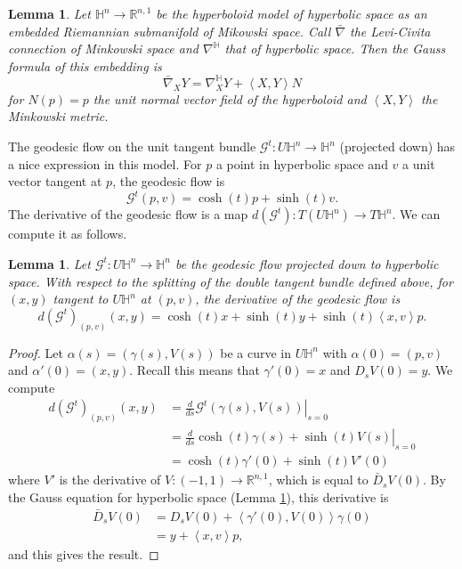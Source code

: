 \documentclass{amsart}
\newcommand{\R}{\mathbb{R}}
\newtheorem{lem}[thm]{Lemma}
\numberwithin{equation}{section}
\renewcommand{\H}{\mathbb{H}}
\begin{document}
\begin{lem}
\label{HypAsSub}
Let $\H^n \to \R^{n,1}$ be the hyperboloid model of hyperbolic space as an embedded Riemannian submanifold of Mikowski space. Call $\bar{\nabla}$ the Levi-Civita connection of Minkowski space and $\nabla^{\H}$ that of hyperbolic space. Then the Gauss formula of this embedding is 
\[
\bar{\nabla}_XY = \nabla^{\H}_XY + \left<X,Y\right>N
\]
for $N(p) = p$ the unit normal vector field of the hyperboloid and $\left<X,Y \right>$ the Minkowski metric.
\end{lem}

The geodesic flow on the unit tangent bundle $\mathcal{G}^t :U \H^n \to \H^n$ (projected down) has a nice expression in this model. 
For $p$ a point in hyperbolic space and $v$ a unit vector tangent at $p$, the geodesic flow is
\[
\mathcal{G}^t(p,v) = \cosh(t)p + \sinh(t)v.
\]
The derivative of the geodesic flow is a map $d(\mathcal{G}^t) : T(U\H^n) \to T\H^n$.
We can compute it as follows.

\begin{lem}
\label{DerGeo}
Let $\mathcal{G}^t: U\H^n \to \H^n$ be the geodesic flow projected down to hyperbolic space. With respect to the splitting of the double tangent bundle defined above, for $(x,y)$ tangent to $U\H^n$ at $(p,v)$, the derivative of the geodesic flow is 
\[
d(\mathcal{G}^t)_{(p,v)}(x,y) = \cosh(t)x + \sinh(t)y + \sinh(t)\left<x,v\right>p.
\]
\end{lem}

\begin{proof}
Let $\alpha(s) = (\gamma(s),V(s))$ be a curve in $U\H^n$ with $\alpha(0) = (p,v)$ and $\alpha'(0) = (x,y)$. 
Recall this means that $\gamma'(0) = x$ and $D_sV(0) = y$.
We compute
\begin{align*}
d(\mathcal{G}^t)_{(p,v)}(x,y)
&= \left. \frac{d}{ds} \mathcal{G}^t(\gamma(s),V(s)) \right|_{s=0} \\
&= \left. \frac{d}{ds} \cosh(t)\gamma(s) + \sinh(t)V(s) \right|_{s=0} \\
&= \cosh(t)\gamma'(0) + \sinh(t)V'(0)
\end{align*}
where $V'$ is the derivative of $V: (-1,1) \to \R^{n,1}$, which is equal to $\bar{D}_sV(0)$.
By the Gauss equation for hyperbolic space (Lemma \ref{HypAsSub}), this derivative is 
\begin{align*}
\bar{D}_sV(0) 
&= D_sV(0) + \left<\gamma'(0),V(0)\right>\gamma(0) \\
&= y + \left< x, v \right>p,
\end{align*}
and this gives the result. 
\end{proof}
\end{document}
